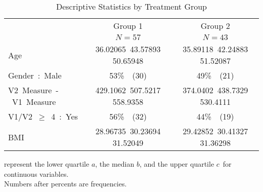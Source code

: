 %
\begin{table}[!tbp]
\caption{Descriptive Statistics by Treatment Group\label{sf1}} 
\begin{center}
\begin{tabular}{lcc}
\hline\hline
\multicolumn{1}{l}{}&\multicolumn{1}{c}{Group 1}&\multicolumn{1}{c}{Group 2}\tabularnewline
&\multicolumn{1}{c}{{\scriptsize $N=57$}}&\multicolumn{1}{c}{{\scriptsize $N=43$}}\tabularnewline
\hline
Age&{\scriptsize 36.02065~}{43.57893 }{\scriptsize 50.65948} &{\scriptsize 35.89118~}{42.24883 }{\scriptsize 51.52087} \tabularnewline
Gender~:~Male&53\%~{\scriptsize~(30)}&49\%~{\scriptsize~(21)}\tabularnewline
V2~Measure~-~V1~Measure&{\scriptsize 429.1062~}{507.5217 }{\scriptsize 558.9358} &{\scriptsize 374.0402~}{438.7329 }{\scriptsize 530.4111} \tabularnewline
V1/V2~$\geq$~4~:~Yes&56\%~{\scriptsize~(32)}&44\%~{\scriptsize~(19)}\tabularnewline
BMI&{\scriptsize 28.96735~}{30.23694 }{\scriptsize 31.52049} &{\scriptsize 29.42852~}{30.41327 }{\scriptsize 31.36298} \tabularnewline
\hline
\end{tabular}
\end{center}
 represent the lower quartile $a$, the median $b$, and the upper quartile $c$\ for continuous variables.\\Numbers after percents are frequencies.\end{table}

